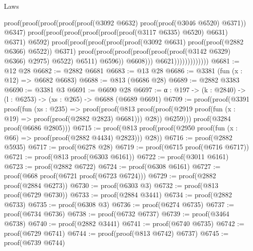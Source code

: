 \begin{lexlean}{Laws}
\begin{coremodule}
                                    proof(proof(proof(proof(proof(@3092 @6632)
                                              proof(proof(@3046 @6520) @6371))
                                            @6347)
                                          proof(proof(proof(proof(proof(proof(@3117 @6335) @6520)
                                                    @6631)
                                                  @6371)
                                                @6592)
                                              proof(proof(proof(proof(proof(@3092 @6631)
                                                        proof(proof(@2882 @6366) @6522))
                                                      @6371)
                                                    proof(proof(proof(proof(proof(proof(@3142 @6329)
                                                                @6366)
                                                              @2975)
                                                            @6522)
                                                          @6511)
                                                        @6596))
                                                  @6608)))
                                        @6621)))))))))))))
@6681 := @12 @28
@6682 := @2882 @6681
@6683 := @13 @28
@6686 := @3381 (fun (x : @12) => @6682 @6683)
@6688 := @813 (@6686 @28)
@6689 := @2882 @3383
@6690 := @3381 @3
@6691 := @6690 @28
@6697 := {α : @197} -> (k : @2840) -> (l : @6253) -> (xs : @265) -> @6688 (@6689 @6691)
@6709 := proof(proof(@3391
        proof(fun (xs : @235) =>
          proof(proof(@813
                proof(proof(@2919 proof(fun (x : @19) => proof(proof(@2882 @2823) @6681))) @28))
              @6259)))
      proof(@3284 proof(@6686 @2805)))
@6715 := proof(@813 proof(proof(@2950 proof(fun (x : @66) => proof(proof(@2882 @4434) @2823))) @28))
@6716 := proof(@2882 @5935)
@6717 := proof(@6278 @28)
@6719 := proof(@6715 proof(@6716 @6717))
@6721 := proof(@813 proof(@6303 @6161))
@6722 := proof(@3011 @6161)
@6723 := proof(@2882 @6722)
@6724 := proof(@6308 @6161)
@6727 := proof(@668 proof(@6721 proof(@6723 @6724)))
@6729 := proof(@2882 proof(@2884 @6273))
@6730 := proof(@6303 @3)
@6732 := proof(@813 proof(@6729 @6730))
@6733 := proof(@2884 @3441)
@6734 := proof(@2882 @6733)
@6735 := proof(@6308 @3)
@6736 := proof(@6274 @6735)
@6737 := proof(@6734 @6736)
@6738 := proof(@6732 @6737)
@6739 := proof(@3464 @6738)
@6740 := proof(@2882 @3441)
@6741 := proof(@6740 @6735)
@6742 := proof(@6729 @6741)
@6744 := proof(proof(@813 @6742) @6737)
@6745 := proof(@6739 @6744)

\end{coremodule}
\end{lexlean}

